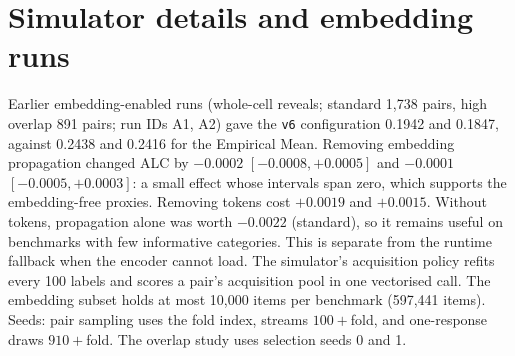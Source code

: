 \documentclass{article}
\begin{document}
\section{Simulator details and embedding runs}\label{app:sim}
Earlier embedding-enabled runs (whole-cell reveals; standard 1{,}738 pairs, high overlap 891 pairs; run IDs A1, A2) gave the \texttt{v6} configuration 0.1942 and 0.1847, against 0.2438 and 0.2416 for the Empirical Mean.
Removing embedding propagation changed ALC by $-0.0002$ $[-0.0008, +0.0005]$ and $-0.0001$ $[-0.0005, +0.0003]$: a small effect whose intervals span zero, which supports the embedding-free proxies.
Removing tokens cost $+0.0019$ and $+0.0015$. Without tokens, propagation alone was worth $-0.0022$ (standard), so it remains useful on benchmarks with few informative categories. This is separate from the runtime fallback when the encoder cannot load.
The simulator's acquisition policy refits every 100 labels and scores a pair's acquisition pool in one vectorised call. The embedding subset holds at most 10{,}000 items per benchmark (597{,}441 items).
Seeds: pair sampling uses the fold index, streams $100+$fold, and one-response draws $910+$fold. The overlap study uses selection seeds 0 and 1.

\end{document}
